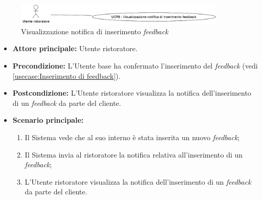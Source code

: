 \newpage
{}
\label{usecase:Visualizzazione notifica di inserimento feedback}

\begin{figure}[h]
	\centering
	\includegraphics[width=0.9\textwidth]{./uml/UCR6.png} 
	\caption{Visualizzazione notifica di inserimento \textit{feedback}}
	\label{fig:UCR6}
  \end{figure}

\begin{itemize}
	\item \textbf{Attore principale:} Utente ristoratore.

	\item \textbf{Precondizione:} L'Utente base ha confermato l'inserimento del \textit{feedback} (vedi \autoref{usecase:Inserimento di feedback}).

	\item \textbf{Postcondizione:} L'Utente ristoratore visualizza la notifica dell'inserimento di un \textit{feedback} da parte del cliente.

	\item \textbf{Scenario principale:}
	      \begin{enumerate}
		      \item Il Sistema vede che al suo interno è stata inserita un nuovo \textit{feedback};
		      \item Il Sistema invia al ristoratore la notifica relativa all'inserimento di un \textit{feedback};
		      \item L'Utente ristoratore visualizza la notifica dell'inserimento di un \textit{feedback} da parte del cliente.
	      \end{enumerate}
\end{itemize}
